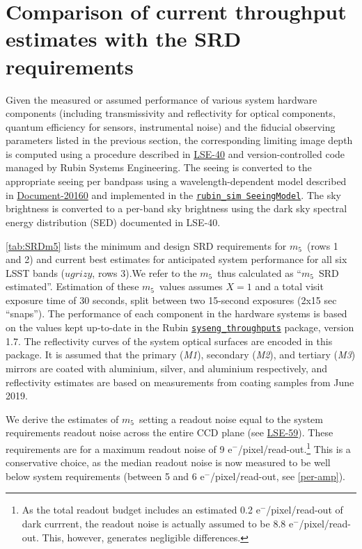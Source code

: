 \documentclass[PST,authoryear,toc]{lsstdoc}
\newcommand{\mf}{\ensuremath{m_5}}
\begin{document}
\section{Comparison of current throughput estimates with the SRD requirements \label{sec:SRD}}

Given the measured or assumed performance of various system hardware components (including transmissivity and reflectivity 
for optical components, quantum efficiency for sensors, instrumental noise) and the fiducial observing 
parameters listed in the previous section, the corresponding limiting image depth is computed using a procedure 
described in 
\href{https://docushare.lsst.org/docushare/dsweb/Get/LSE-40}{{LSE-40}}
and version-controlled code managed by Rubin Systems Engineering. The seeing is converted to the appropriate 
seeing per bandpass using a wavelength-dependent model described in 
\href{https://docushare.lsst.org/docushare/dsweb/Get/Document-20160}{{Document-20160}} 
and implemented in the 
\href{https://github.com/lsst/rubin_sim/blob/main/rubin_sim/site_models/seeingModel.py}{{\tt rubin\_sim SeeingModel}}. 
The sky brightness is converted to a per-band sky brightness using the dark sky spectral energy distribution (SED) documented in LSE-40.


\autoref{tab:SRDm5} lists the minimum and design SRD requirements for \mf\ (rows 1 and 2) and current best estimates for anticipated system performance for all six LSST bands ($ugrizy$, rows 3).We refer to the \mf\ thus calculated as  ``\mf\ SRD estimated''. Estimation of these \mf\ values assumes $X=1$ and a total visit exposure time of 30 seconds, split between two 15-second exposures (2x15 sec ``snaps''). The performance of each component in the hardware systems is based on the values kept up-to-date in the Rubin \href{https://github.com/lsst-pst/syseng_throughputs}{{\tt syseng\_throughputs}} package, version 1.7. {The  reflectivity curves of the system optical surfaces are encoded in this package. It is assumed that the primary ({\it M1}), secondary ({\it M2}), and tertiary ({\it M3}) mirrors are coated with aluminium, silver, and aluminium respectively, and reflectivity estimates are based on measurements from coating samples from June 2019.}

We derive the estimates of \mf\ setting a readout noise equal to the system requirements readout noise across the entire CCD plane (see \href{https://docushare.lsst.org/docushare/dsweb/Get/LSE-59}{{LSE-59}}). These requirements are for a maximum readout noise of 9 e$^-$/pixel/read-out.\footnote{As the total readout budget includes an estimated 0.2  e$^-$/pixel/read-out of dark currrent, the readout noise is actually assumed to be 8.8  e$^-$/pixel/read-out. This, however, generates negligible differences.} This is a conservative choice, as the median readout noise is now measured to be well below system requirements (between 5 and 6  e$^-$/pixel/read-out, see \autoref{per-amp}).  
\end{document}
